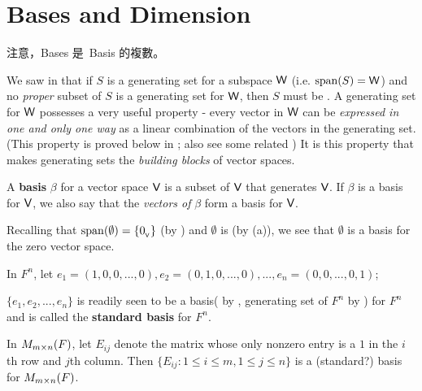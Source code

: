 \section{Bases and Dimension} \label{sec 1.6}

\begin{note}
注意，Bases 是\ Basis 的複數。
\end{note}

We saw in  that if \(S\) is a generating set for a subspace \(\textsf{W}\) (i.e. \(\operatorname{span}(S) = \textsf{W}\)) and no \emph{proper} subset of \(S\) is a generating set for \(\textsf{W}\), then \(S\) must be \LID{}.
A \LID{} generating set for \(\textsf{W}\) possesses a very useful property - every vector in \(\textsf{W}\) can be \emph{expressed in one and only one way} as a linear combination of the vectors in the generating set.
(This property is proved below in ; also see some related )
It is this property that makes \LID{}
generating sets the \emph{building blocks} of vector spaces.

\begin{definition} \label{def 1.8}
A \textbf{basis} \(\beta\) for a vector space \(\textsf{V}\) is a  \LID{} subset of \(\textsf{V}\)  that generates \(\textsf{V}\).
If \(\beta\) is a basis for \(\textsf{V}\), we also say that the
\emph{vectors of} \(\beta\) form a basis for \(\textsf{V}\).
\end{definition}

\begin{example} \label{example 1.6.1}
Recalling that \(\operatorname{span}(\emptyset) = \{ 0_{_{\textsf{V}}} \}\) (by ) and \(\emptyset\) is \LID{} (by (a)), we see that \(\emptyset\) is a basis for the zero vector space.
\end{example}

\begin{example} \label{example 1.6.2}
In \(F^n\), let \(e_1 = (1, 0, 0, ..., 0), e_2 = (0, 1, 0, ..., 0), ..., e_n = (0, 0, ..., 0, 1)\);

\(\{ e_1, e_2, ..., e_n \}\) is readily seen to be a basis(\LID{} by , generating set of \(F^n\) by ) for \(F^n\) and is called the \textbf{standard basis} for \(F^n\).
\end{example}

\begin{example} \label{example 1.6.3}
In \(M_{m \times n}(F)\), let \(E_{ij}\) denote the matrix whose only nonzero entry is a \(1\) in the \(i\)th row and \(j\)th column.
Then \(\{ E_{ij} : 1 \le i \le m, 1 \le j \le n \}\) is a (standard?) basis for \(M_{m \times n}(F)\).
\end{example}

